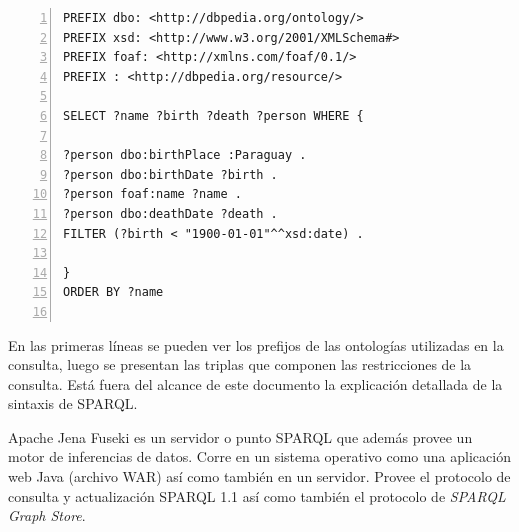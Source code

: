\lstset{
    language=SPARQL
}
\noindent\begin{minipage}{\textwidth}
\begin{lstlisting}[captionpos=b, caption=Ejemplo de consulta SPARQL, label=lst:consulta-sparql,  numbers=left,  numberstyle=\tiny\color{mygray},
    basicstyle=\footnotesize\ttfamily,frame=single]
PREFIX dbo: <http://dbpedia.org/ontology/>
PREFIX xsd: <http://www.w3.org/2001/XMLSchema#>
PREFIX foaf: <http://xmlns.com/foaf/0.1/>
PREFIX : <http://dbpedia.org/resource/>

SELECT ?name ?birth ?death ?person WHERE { 

?person dbo:birthPlace :Paraguay . 
?person dbo:birthDate ?birth . 
?person foaf:name ?name . 
?person dbo:deathDate ?death . 
FILTER (?birth < "1900-01-01"^^xsd:date) . 

}
ORDER BY ?name
 
\end{lstlisting}
\end{minipage}

En las primeras líneas se pueden ver los prefijos de las ontologías utilizadas en la consulta, luego se presentan las triplas que componen las restricciones de la consulta. Está fuera del alcance de este documento la explicación detallada de la sintaxis de SPARQL.

Apache Jena Fuseki es un servidor o punto SPARQL que además provee un motor de inferencias de datos. Corre en un sistema operativo como una aplicación web Java (archivo WAR) así como también en un servidor. Provee el protocolo de consulta y actualización SPARQL 1.1 así como también el protocolo de\textit{ SPARQL Graph Store}.
